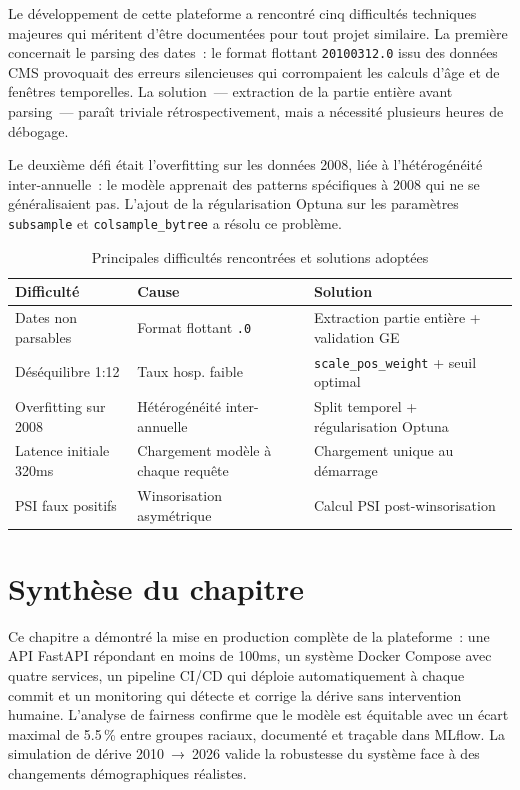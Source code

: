 Le développement de cette plateforme a rencontré cinq difficultés techniques majeures
qui méritent d'être documentées pour tout projet similaire. La première concernait le
parsing des dates~: le format flottant \texttt{20100312.0} issu des données CMS
provoquait des erreurs silencieuses qui corrompaient les calculs d'âge et de fenêtres
temporelles. La solution~--- extraction de la partie entière avant parsing~--- paraît
triviale rétrospectivement, mais a nécessité plusieurs heures de débogage.

Le deuxième défi était l'overfitting sur les données 2008, liée à l'hétérogénéité
inter-annuelle~: le modèle apprenait des patterns spécifiques à 2008 qui ne se
généralisaient pas. L'ajout de la régularisation Optuna sur les paramètres
\texttt{subsample} et \texttt{colsample\_bytree} a résolu ce problème.

\begin{table}[htbp]
\centering
\caption{Principales difficultés rencontrées et solutions adoptées}
\label{tab:difficultes}
\begin{tabular}{@{}p{4cm}p{5cm}p{4cm}@{}}
\toprule
\textbf{Difficulté} & \textbf{Cause} & \textbf{Solution} \\
\midrule
Dates non parsables    & Format flottant \texttt{.0}
  & Extraction partie entière + validation GE \\
Déséquilibre 1:12      & Taux hosp. faible
  & \texttt{scale\_pos\_weight} + seuil optimal \\
Overfitting sur 2008   & Hétérogénéité inter-annuelle
  & Split temporel + régularisation Optuna \\
Latence initiale 320ms & Chargement modèle à chaque requête
  & Chargement unique au démarrage \\
PSI faux positifs      & Winsorisation asymétrique
  & Calcul PSI post-winsorisation \\
\bottomrule
\end{tabular}
\end{table}

\section*{Synthèse du chapitre}

Ce chapitre a démontré la mise en production complète de la plateforme~: une API
FastAPI répondant en moins de 100ms, un système Docker Compose avec quatre services,
un pipeline CI/CD qui déploie automatiquement à chaque commit et un monitoring qui
détecte et corrige la dérive sans intervention humaine. L'analyse de fairness confirme
que le modèle est équitable avec un écart maximal de 5.5\,\% entre groupes raciaux,
documenté et traçable dans MLflow. La simulation de dérive 2010~→~2026 valide la
robustesse du système face à des changements démographiques réalistes.

